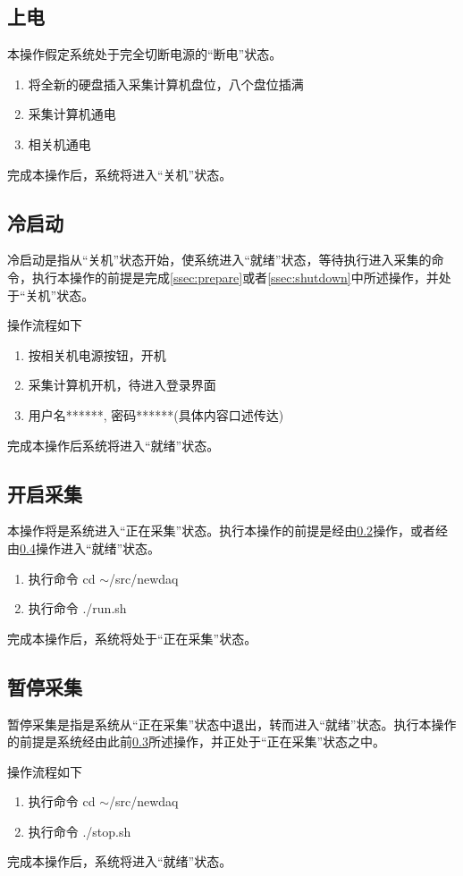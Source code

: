 \documentclass[11pt,includemp,a4paper]{article}
\begin{document}
\subsection{上电}
本操作假定系统处于完全切断电源的“断电”状态。
\label{ssec:prepare}
\begin{enumerate}
    \item 将全新的硬盘插入采集计算机盘位，八个盘位插满
    \item 采集计算机通电
    \item 相关机通电
\end{enumerate}
完成本操作后，系统将进入“关机”状态。

\subsection{冷启动}
\label{ssec:cold_start}
冷启动是指从“关机”状态开始，使系统进入“就绪”状态，等待执行进入采集的命令，执行本操作的前提是完成\ref{ssec:prepare}或者\ref{ssec:shutdown}中所述操作，并处于“关机”状态。

操作流程如下
\begin{enumerate}
    \item 按相关机电源按钮，开机
    \item 采集计算机开机，待进入登录界面
    \item 用户名******, 密码******(具体内容口述传达)
\end{enumerate}
完成本操作后系统将进入“就绪”状态。

\subsection{开启采集}
\label{ssec:daq}
本操作将是系统进入“正在采集”状态。执行本操作的前提是经由\ref{ssec:cold_start}操作，或者经由\ref{ssec:stop}操作进入“就绪”状态。
\begin{enumerate}
    \item 执行命令 cd $\sim$/src/newdaq
    \item 执行命令 ./run.sh
\end{enumerate}
完成本操作后，系统将处于“正在采集”状态。

\subsection{暂停采集}
\label{ssec:stop}
暂停采集是指是系统从“正在采集”状态中退出，转而进入“就绪”状态。执行本操作的前提是系统经由此前\ref{ssec:daq}所述操作，并正处于“正在采集”状态之中。

操作流程如下
\begin{enumerate}
    \item 执行命令 cd $\sim$/src/newdaq
    \item 执行命令 ./stop.sh
\end{enumerate}
完成本操作后，系统将进入“就绪”状态。
\end{document}
